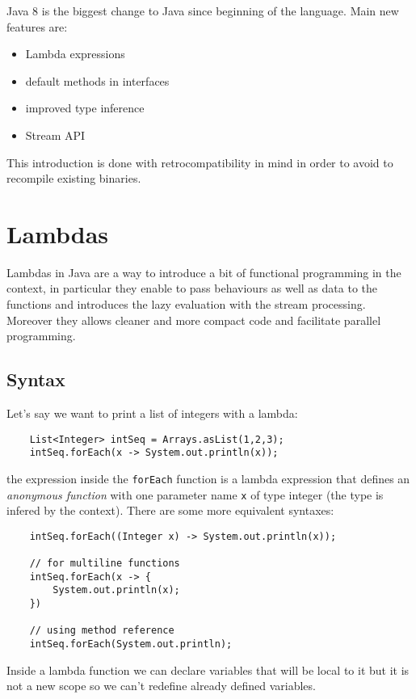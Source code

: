 Java 8 is the biggest change to Java since beginning of the language.
Main new features are:
\begin{itemize}
    \item Lambda expressions
    \item default methods in interfaces
    \item improved type inference
    \item Stream API
\end{itemize}
This introduction is done with retrocompatibility in mind in order to avoid to recompile existing binaries.

\section{Lambdas}
Lambdas in Java are a way to introduce a bit of functional programming in the context, in particular they enable to pass behaviours as well as data to the functions and introduces the lazy evaluation with the stream processing.
Moreover they allows cleaner and more compact code and facilitate parallel programming.

\subsection{Syntax}
Let's say we want to print a list of integers with a lambda:
\begin{verbatim}
    List<Integer> intSeq = Arrays.asList(1,2,3);
    intSeq.forEach(x -> System.out.println(x));
\end{verbatim}
the expression inside the \verb|forEach| function is a lambda expression that defines an \emph{anonymous function} with one parameter name \verb|x| of type integer (the type is infered by the context).
There are some more equivalent syntaxes:
\begin{verbatim}
    intSeq.forEach((Integer x) -> System.out.println(x));

    // for multiline functions
    intSeq.forEach(x -> {
        System.out.println(x);
    })

    // using method reference
    intSeq.forEach(System.out.println);
\end{verbatim}

Inside a lambda function we can declare variables that will be local to it but it is not a new scope so we can't redefine already defined variables.

